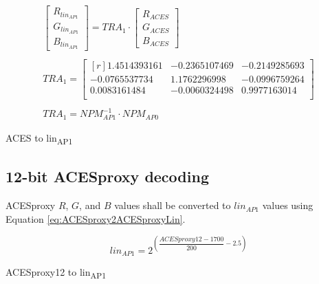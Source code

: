 \begin{floatequ} 
\begin{gather}
    \begin{bmatrix}
        R_{lin_{AP1}}\\
        G_{lin_{AP1}}\\
        B_{lin_{AP1}}
    \end{bmatrix}
    =
    TRA_{1}
    \cdot
    \begin{bmatrix}
        R_{ACES}\\
        G_{ACES}\\
        B_{ACES}
    \end{bmatrix} \\
    \\
    TRA_{1} =
    \begin{bmatrix*}[r]
        1.4514393161 & -0.2365107469 & -0.2149285693 \\
       -0.0765537734 &  1.1762296998 & -0.0996759264 \\
        0.0083161484 & -0.0060324498 &  0.9977163014 \\
    \end{bmatrix*} \\
    \\
    TRA_{1} = NPM^{-1}_{AP1} \cdot NPM_{AP0}
\end{gather}
\caption{ACES to lin\textsubscript{AP1}}
\label{eq:ACES2linAP112}
\end{floatequ}




\subsection{12-bit ACESproxy decoding}
ACESproxy $R$, $G$, and $B$ values shall be converted to $lin_{AP1}$ values using Equation \ref{eq:ACESproxy2ACESproxyLin}.

\begin{floatequ} 
\begin{equation} 
    lin_{AP1} = 2^{\left(\dfrac{ACESproxy12-1700}{200}-2.5\right)}
\end{equation}
\caption{ACESproxy12 to lin\textsubscript{AP1}}
\label{eq:ACESproxy2linAP1}
\end{floatequ}

